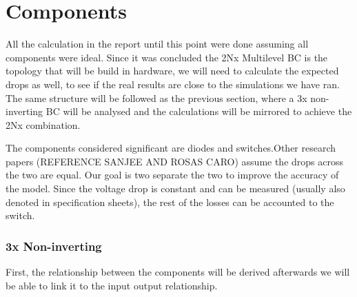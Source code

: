 \section{Components}\label{ch:CD}

All the calculation in the report until this point were done assuming all components were ideal. Since it was concluded the 2Nx Multilevel BC is the topology that will be build in hardware, we will need to calculate the expected drops as well, to see if the real results are close to the simulations we have ran. 
The same structure will be followed as the previous section, where a 3x non-inverting BC will be analysed and the calculations will be mirrored to achieve the 2Nx combination.

The components considered significant are diodes and switches.Other research papers (REFERENCE SANJEE AND ROSAS CARO) assume the drops across the two are equal. Our goal is two separate the two to improve the accuracy of the model. Since the voltage drop is constant and can be measured (usually also denoted in specification sheets), the rest of the losses can be accounted to the switch.

\subsubsection{3x Non-inverting}

First, the relationship between the components will be derived afterwards we will be able to link it to the input output relationship.

